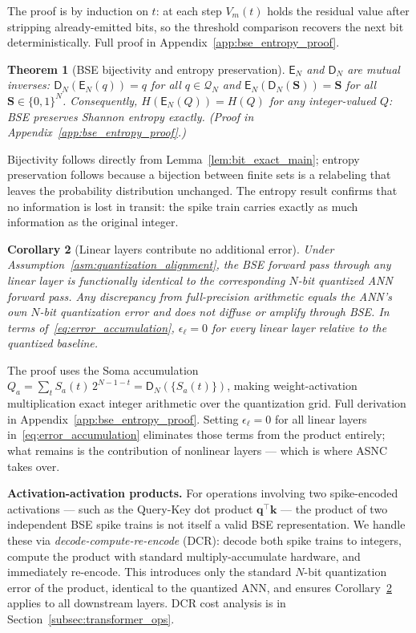 \documentclass{article}
\theoremstyle{plain}
\newtheorem{theorem}{Theorem}[section]
\newtheorem{corollary}[theorem]{Corollary}
\theoremstyle{definition}
\theoremstyle{remark}
\begin{document}
The proof is by induction on $t$: at each step $V_m(t)$ holds the residual value after stripping already-emitted bits, so the threshold comparison recovers the next bit deterministically. Full proof in Appendix~\ref{app:bse_entropy_proof}.

\begin{theorem}[BSE bijectivity and entropy preservation]
\label{thm:bse_main}
$\mathsf{E}_N$ and $\mathsf{D}_N$ are mutual inverses: $\mathsf{D}_N(\mathsf{E}_N(q))=q$ for all $q\in\mathcal{Q}_N$ and $\mathsf{E}_N(\mathsf{D}_N(\mathbf{S}))=\mathbf{S}$ for all $\mathbf{S}\in\{0,1\}^N$. Consequently, $H(\mathsf{E}_N(Q))=H(Q)$ for any integer-valued $Q$: BSE preserves Shannon entropy exactly. (Proof in Appendix~\ref{app:bse_entropy_proof}.)
\end{theorem}

Bijectivity follows directly from Lemma~\ref{lem:bit_exact_main}; entropy preservation follows because a bijection between finite sets is a relabeling that leaves the probability distribution unchanged. The entropy result confirms that no information is lost in transit: the spike train carries exactly as much information as the original integer.

\begin{corollary}[Linear layers contribute no additional error]
\label{cor:no_diffusion_main}
Under Assumption~\ref{asm:quantization_alignment}, the BSE forward pass through any linear layer is functionally identical to the corresponding $N$-bit quantized ANN forward pass. Any discrepancy from full-precision arithmetic equals the ANN's own $N$-bit quantization error and does not diffuse or amplify through BSE. In terms of~\eqref{eq:error_accumulation}, $\epsilon_\ell = 0$ for every linear layer relative to the quantized baseline.
\end{corollary}

The proof uses the Soma accumulation $Q_a = \sum_t S_a(t)\,2^{N-1-t} = \mathsf{D}_N(\{S_a(t)\})$, making weight-activation multiplication exact integer arithmetic over the quantization grid. Full derivation in Appendix~\ref{app:bse_entropy_proof}. Setting $\epsilon_\ell = 0$ for all linear layers in~\eqref{eq:error_accumulation} eliminates those terms from the product entirely; what remains is the contribution of nonlinear layers — which is where ASNC takes over.

\noindent\textbf{Activation-activation products.}
For operations involving two spike-encoded activations — such as the Query-Key dot product $\mathbf{q}^\top\mathbf{k}$ — the product of two independent BSE spike trains is not itself a valid BSE representation. We handle these via \emph{decode-compute-re-encode} (DCR): decode both spike trains to integers, compute the product with standard multiply-accumulate hardware, and immediately re-encode. This introduces only the standard $N$-bit quantization error of the product, identical to the quantized ANN, and ensures Corollary~\ref{cor:no_diffusion_main} applies to all downstream layers. DCR cost analysis is in Section~\ref{subsec:transformer_ops}.
\end{document}
